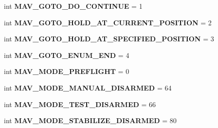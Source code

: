 \begin{DoxyCompactItemize}
\item 
\mbox{\label{namespacepymavlink_1_1dialects_1_1v10_adb8389b0a37ec08dc8d6d68b89e930ec}} 
int {\bfseries M\+A\+V\+\_\+\+G\+O\+T\+O\+\_\+\+D\+O\+\_\+\+C\+O\+N\+T\+I\+N\+UE} = 1
\item 
\mbox{\label{namespacepymavlink_1_1dialects_1_1v10_a208118d08828b29d55014e5062dadeed}} 
int {\bfseries M\+A\+V\+\_\+\+G\+O\+T\+O\+\_\+\+H\+O\+L\+D\+\_\+\+A\+T\+\_\+\+C\+U\+R\+R\+E\+N\+T\+\_\+\+P\+O\+S\+I\+T\+I\+ON} = 2
\item 
\mbox{\label{namespacepymavlink_1_1dialects_1_1v10_a6df08324d8a86e88250ec4eeaab84afd}} 
int {\bfseries M\+A\+V\+\_\+\+G\+O\+T\+O\+\_\+\+H\+O\+L\+D\+\_\+\+A\+T\+\_\+\+S\+P\+E\+C\+I\+F\+I\+E\+D\+\_\+\+P\+O\+S\+I\+T\+I\+ON} = 3
\item 
\mbox{\label{namespacepymavlink_1_1dialects_1_1v10_a33998ad44445c8a66d9420537fc4f75f}} 
int {\bfseries M\+A\+V\+\_\+\+G\+O\+T\+O\+\_\+\+E\+N\+U\+M\+\_\+\+E\+ND} = 4
\item 
\mbox{\label{namespacepymavlink_1_1dialects_1_1v10_a1d7cbeb56511dc1b4b70bf3d2bbad543}} 
int {\bfseries M\+A\+V\+\_\+\+M\+O\+D\+E\+\_\+\+P\+R\+E\+F\+L\+I\+G\+HT} = 0
\item 
\mbox{\label{namespacepymavlink_1_1dialects_1_1v10_a2338d2761635a28d13edf7375a3e024a}} 
int {\bfseries M\+A\+V\+\_\+\+M\+O\+D\+E\+\_\+\+M\+A\+N\+U\+A\+L\+\_\+\+D\+I\+S\+A\+R\+M\+ED} = 64
\item 
\mbox{\label{namespacepymavlink_1_1dialects_1_1v10_ab19390d578bf4db4eb3387781189ee1a}} 
int {\bfseries M\+A\+V\+\_\+\+M\+O\+D\+E\+\_\+\+T\+E\+S\+T\+\_\+\+D\+I\+S\+A\+R\+M\+ED} = 66
\item 
\mbox{\label{namespacepymavlink_1_1dialects_1_1v10_ab439fa93a96f2e667c73f92ebfcf34cc}} 
int {\bfseries M\+A\+V\+\_\+\+M\+O\+D\+E\+\_\+\+S\+T\+A\+B\+I\+L\+I\+Z\+E\+\_\+\+D\+I\+S\+A\+R\+M\+ED} = 80
\item 

\end{DoxyCompactItemize}
